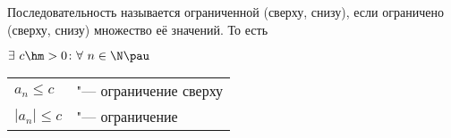 
        Последовательность называется ограниченной (сверху, снизу), если ограничено (сверху, снизу) множество её значений. То есть

        $\exists\  c\hm>0\colon \forall\  n\in\N\pau$ \begin{tabular}{ll}
        $a_n\leq c$&"--- ограничение сверху\\
        $|a_n|\leq c$&"--- ограничение
        \end{tabular}
    